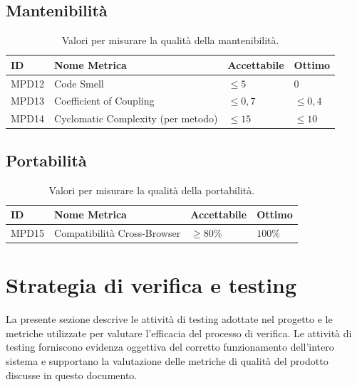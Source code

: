 \documentclass[a4paper,12pt]{article}
\begin{document}
\subsection{Mantenibilità}
\begin{table}[H]
    \centering
    \renewcommand{\arraystretch}{1.2}
    \begin{tabularx}{\textwidth}{|p{2.4cm}|X|p{3cm}|p{3cm}|}
        \hline
        \rowcolor{gray!20}
        \textbf{ID} & \textbf{Nome Metrica} & \textbf{Accettabile} & \textbf{Ottimo} \\
        \hline
        MPD12 & Code Smell & $\leq 5$ & $0$ \\
        MPD13 & Coefficient of Coupling & $\leq 0{,}7$ & $\leq 0{,}4$ \\
        MPD14 & Cyclomatic Complexity (per metodo) & $\leq 15$ & $\leq 10$ \\
        \hline
    \end{tabularx}
    \caption{Valori per misurare la qualità della mantenibilità.}
\end{table}

\subsection{Portabilità}
\begin{table}[H]
    \centering
    \renewcommand{\arraystretch}{1.2}
    \begin{tabularx}{\textwidth}{|p{2.4cm}|X|p{3cm}|p{3cm}|}
        \hline
        \rowcolor{gray!20}
        \textbf{ID} & \textbf{Nome Metrica} & \textbf{Accettabile} & \textbf{Ottimo} \\
        \hline
        MPD15 & Compatibilità Cross-Browser & $\geq 80\%$ & $100\%$ \\
        \hline
    \end{tabularx}
    \caption{Valori per misurare la qualità della portabilità.}
\end{table}

\section{Strategia di verifica e testing}
\label{sec:strategia-testing}
La presente sezione descrive le attività di testing adottate nel progetto e le metriche utilizzate per valutare l'efficacia del processo di verifica.
Le attività di testing forniscono evidenza oggettiva del corretto funzionamento dell'intero sistema e supportano la valutazione delle metriche di qualità del prodotto discusse in questo documento.
\end{document}
